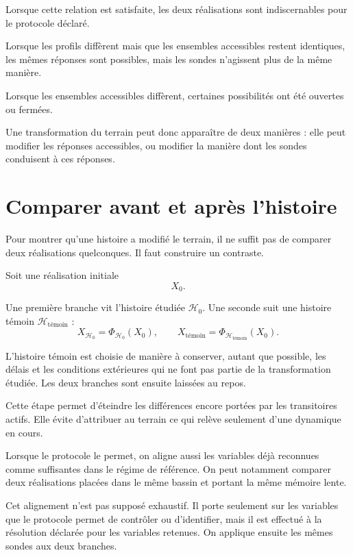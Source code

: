 Lorsque cette relation est satisfaite, les deux réalisations sont
indiscernables pour le protocole déclaré.

Lorsque les profils diffèrent mais que les ensembles accessibles restent identiques, les mêmes réponses sont possibles, mais les sondes n'agissent plus de la même manière.

Lorsque les ensembles accessibles diffèrent, certaines possibilités ont été ouvertes ou fermées.

Une transformation du terrain peut donc apparaître de deux manières : elle peut modifier les réponses accessibles, ou modifier la manière dont les sondes conduisent à ces réponses.

\section{Comparer avant et après l'histoire}
\label{t3-comparer-avant-apres-histoire}

Pour montrer qu'une histoire a modifié le terrain, il ne suffit pas de comparer deux réalisations quelconques. Il faut construire un contraste.

Soit une réalisation initiale
\[
X_0.
\]

Une première branche vit l'histoire étudiée $\mathcal H_0$.
Une seconde suit une histoire témoin $\mathcal H_{\text{t\'emoin}}$ :
\[
X_{\mathcal H_0}
=
\Phi_{\mathcal H_0}(X_0),
\qquad
X_{\text{t\'emoin}}
=
\Phi_{\mathcal H_{\text{t\'emoin}}}(X_0).
\]

L'histoire témoin est choisie de manière à conserver, autant que possible, les délais et les conditions extérieures qui ne font pas partie de la transformation étudiée. Les deux branches sont ensuite laissées au repos.

Cette étape permet d'éteindre les différences encore portées par les transitoires actifs. Elle évite d'attribuer au terrain ce qui relève seulement d'une dynamique en cours.

Lorsque le protocole le permet, on aligne aussi les variables déjà reconnues comme suffisantes dans le régime de référence. On peut notamment comparer deux réalisations placées dans le même bassin et portant la même mémoire lente.

Cet alignement n'est pas supposé exhaustif. Il porte seulement sur les variables que le protocole permet de contrôler ou d'identifier, mais il est effectué à la résolution déclarée pour les variables retenues. 
On applique ensuite les mêmes sondes aux deux branches.

